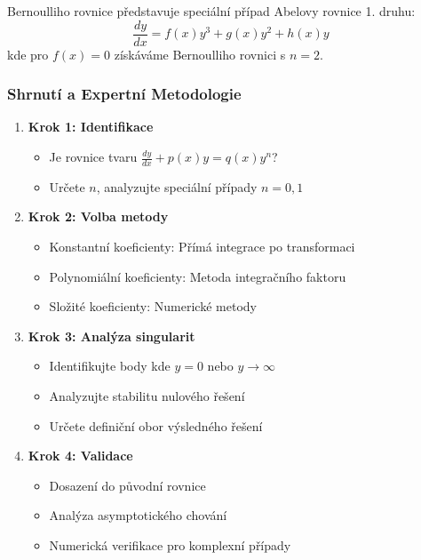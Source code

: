 \vspace{0.6\baselineskip}

\begin{remark}
\label{rem:abelovy-rovnice-zobecneni}
Bernoulliho rovnice představuje speciální případ Abelovy rovnice 1. druhu:
\[
\frac{dy}{dx} = f(x)y^3 + g(x)y^2 + h(x)y
\]
kde pro $f(x) = 0$ získáváme Bernoulliho rovnici s $n = 2$.
\end{remark}

\vspace{0.8\baselineskip}

\subsubsection{Shrnutí a Expertní Metodologie}
\label{subsubsec:l2-shrnuti-metodologie}

\begin{method}
\label{met:decision-tree-bernoulli}
\begin{enumerate}
\item \textbf{Krok 1: Identifikace}
\begin{itemize}
\item Je rovnice tvaru $\frac{dy}{dx} + p(x)y = q(x)y^n$?
\item Určete $n$, analyzujte speciální případy $n = 0, 1$
\end{itemize}

\item \textbf{Krok 2: Volba metody}
\begin{itemize}
\item Konstantní koeficienty: Přímá integrace po transformaci
\item Polynomiální koeficienty: Metoda integračního faktoru
\item Složité koeficienty: Numerické metody
\end{itemize}

\item \textbf{Krok 3: Analýza singularit}
\begin{itemize}
\item Identifikujte body kde $y = 0$ nebo $y \to \infty$
\item Analyzujte stabilitu nulového řešení
\item Určete definiční obor výsledného řešení
\end{itemize}

\item \textbf{Krok 4: Validace}
\begin{itemize}
\item Dosazení do původní rovnice
\item Analýza asymptotického chování
\item Numerická verifikace pro komplexní případy
\end{itemize}
\end{enumerate}
\end{method}

